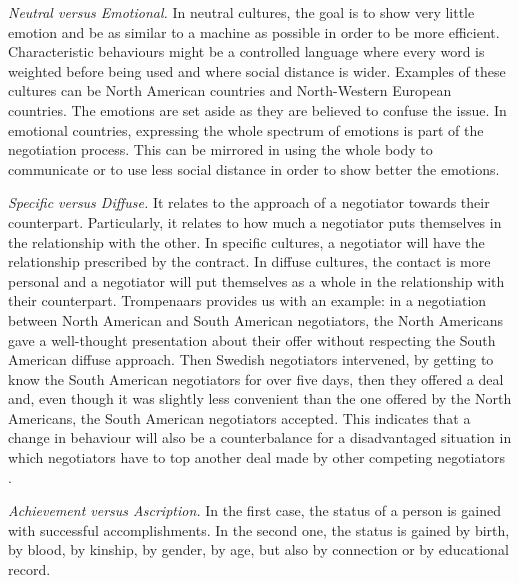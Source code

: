 \documentclass[../main.tex]{subfiles}
\begin{document}
\textit{Neutral versus Emotional.} In neutral cultures, the goal is to show very little emotion and be as similar to a machine as possible in order to be more efficient. Characteristic behaviours might be a controlled language where every word is weighted before being used and where social distance is wider. Examples of these cultures can be North American countries and North-Western European countries. The emotions are set aside as they are believed to confuse the issue. In emotional countries, expressing the whole spectrum of emotions is part of the negotiation process. This can be mirrored in using the whole body to communicate or to use less social distance in order to show better the emotions.

\textit{Specific versus Diffuse.} It relates to the approach of a negotiator towards their counterpart. Particularly, it relates to how much a negotiator puts themselves in the relationship with the other. In specific cultures, a negotiator will have the relationship prescribed by the contract. In diffuse cultures, the contact is more personal and a negotiator will put themselves as a whole in the relationship with their counterpart. Trompenaars provides us with an example: in a negotiation between North American and South American negotiators, the North Americans gave a well-thought presentation about their offer without respecting the South American diffuse approach. Then Swedish negotiators intervened, by getting to know the South American negotiators for over five days, then they offered a deal and, even though it was slightly less convenient than the one offered by the North Americans, the South American negotiators accepted. This indicates that a change in behaviour will also be a counterbalance for a disadvantaged situation in which negotiators have to top another deal made by other competing negotiators \mancite\autocite[9]{trompenaars}.

\textit{Achievement versus Ascription.} In the first case, the status of a person is gained with successful accomplishments. In the second one, the status is gained by birth, by blood, by kinship, by gender, by age, but also by connection or by educational record.
\end{document}
